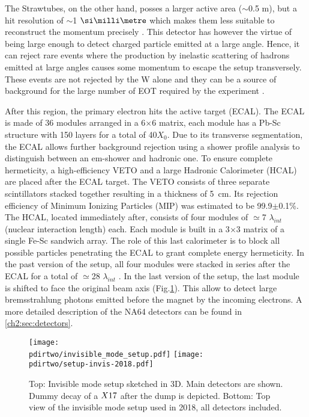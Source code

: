 The Strawtubes, on the other hand, posses a larger active area ($\sim$0.5 m), but a hit resolution of $\sim$1 $\mmi$ which makes them less suitable to reconstruct the momentum precisely \cite{Volkov:2019qhb}. This detector has however the virtue of being large enough to detect charged particle emitted at a large angle. Hence, it can reject rare events where the production by inelastic scattering of hadrons emitted at large angles causes some momentum to escape the setup transversely. These events are not rejected by the W alone and they can be a source of background for the large number of EOT required by the experiment \cite{na64-prd}. 

After this region, the primary electron hits the active target (ECAL). The ECAL is made of 36 modules arranged in a 6$\times$6 matrix, each module has a Pb-Sc structure with 150 layers for a total of 40$X_0$. Due to its transverse segmentation, the ECAL allows further background rejection using a shower profile analysis to distinguish between an em-shower and hadronic one. To ensure complete hermeticity, a high-efficiency VETO and a large Hadronic Calorimeter (HCAL) are placed after the ECAL target. The VETO consists of three separate scintillators stacked together resulting in a thickness of \SI{5}{\centi\meter}. Its rejection efficiency of Minimum Ionizing Particles (MIP) was estimated to be 99.9$\pm$0.1\%. The HCAL, located immediately after, consists of four modules of $\simeq$7 $\lambda_{int}$ (nuclear interaction length) each. Each module is built in a 3$\times$3 matrix of a single Fe-Sc sandwich array. The role of this last calorimeter is to block all possible particles penetrating the ECAL to grant complete energy hermeticity. In the past version of the setup, all four modules were stacked in series after the ECAL for a total of $\simeq$28 $\lambda_{int}$ \cite{Banerjee:2016tad}. In the last version of the setup, the last module is shifted to face the original beam axis (Fig.\ref{fig:setup-invis-2018}). This allow to detect large bremsstrahlung photons emitted before the magnet by the incoming electrons. A more detailed description of the NA64 detectors can be found in \ref{ch2:sec:detectors}.

\begin{figure}[tbh!]
  \centering
  \texttt{[image: \\pdirtwo/invisible\_mode\_setup.pdf]}
\texttt{[image: \\pdirtwo/setup-invis-2018.pdf]}
\caption[invisible mode setup 2018]{Top: Invisible mode setup sketched in 3D. Main detectors are shown. Dummy decay of a $X17$ after the dump is depicted. Bottom: Top view of the invisible mode setup used in 2018, all detectors included.}
\label{fig:setup-invis-2018}
\end{figure}

